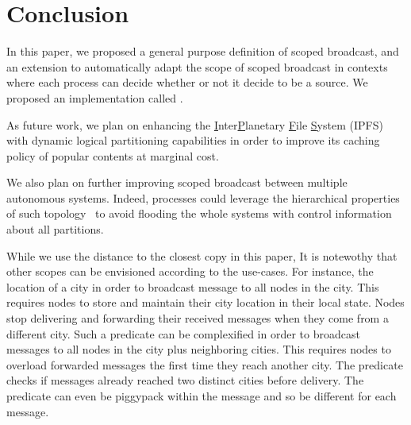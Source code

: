 
\section{Conclusion}
\label{sec:conclusion}

In this paper, we proposed a general purpose definition of scoped
broadcast, and an extension to automatically adapt the scope of scoped
broadcast in contexts where each process can decide whether or not it
decide to be a source. We proposed an implementation called \NAME.

As future work, we plan on enhancing the
\underline{I}nter\underline{P}lanetary \underline{F}ile
\underline{S}ystem (IPFS)~\cite{henningsen2020mapping} with dynamic
logical partitioning capabilities in order to improve its caching
policy of popular contents at marginal cost.


\noindent We also plan on further improving scoped broadcast between
multiple autonomous systems. Indeed, processes could leverage the
hierarchical properties of such topology~\cite{nur2018geography} to
avoid flooding the whole systems with control information about all
partitions.


While we use the distance to the closest copy in this paper, It is
notewothy that other scopes can be envisioned according to the
use-cases.  For instance, the location of a city in order to broadcast
message to all nodes in the city.  This requires nodes to store and
maintain their city location in their local state. Nodes stop
delivering and forwarding their received messages when they come from
a different city. Such a predicate can be complexified in order to
broadcast messages to all nodes in the city plus neighboring
cities. This requires nodes to overload forwarded messages the first
time they reach another city. The predicate checks if messages already
reached two distinct cities before delivery.  The predicate can even
be piggypack within the message and so be different for each
message.

